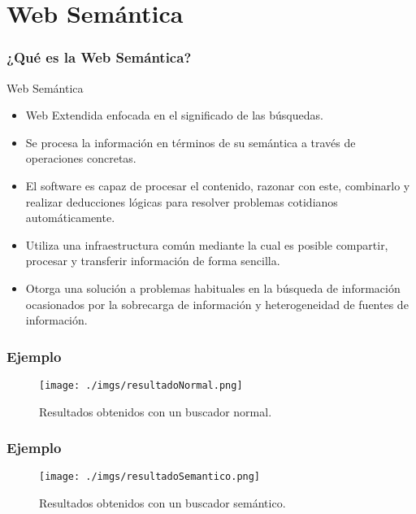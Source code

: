 \documentclass{beamer}
\begin{document}
\section{Web Semántica} 
\begin{frame}
\frametitle{¿Qué es la Web Semántica?} 
\begin{block}{Web Semántica}
\begin{itemize}
\item<1-> Web Extendida enfocada en el significado de las búsquedas.
\item<2-> Se procesa la información en términos de su semántica a través de operaciones concretas.
\item<3-> El software es capaz de procesar el contenido, razonar con este, combinarlo y realizar deducciones lógicas para resolver problemas cotidianos automáticamente.
\item<4-> Utiliza una infraestructura común mediante la cual es posible compartir, procesar y transferir información de forma sencilla.
\item<5-> Otorga una solución a problemas habituales en la búsqueda de información ocasionados por la sobrecarga de información y heterogeneidad de fuentes de información.
\end{itemize}
\end{block}
\end{frame}
\begin{frame}
\frametitle{Ejemplo} 
\begin{figure}[H] %
\begin{center}
\texttt{[image: ./imgs/resultadoNormal.png]}
\caption{Resultados obtenidos con un buscador normal.}
\end{center}
\end{figure}
\end{frame}
\begin{frame}
\frametitle{Ejemplo} 
\begin{figure}[H] %
\begin{center}
\texttt{[image: ./imgs/resultadoSemantico.png]}
\caption{Resultados obtenidos con un buscador semántico.}
\end{center}
\end{figure}
\end{frame}
\end{document}
